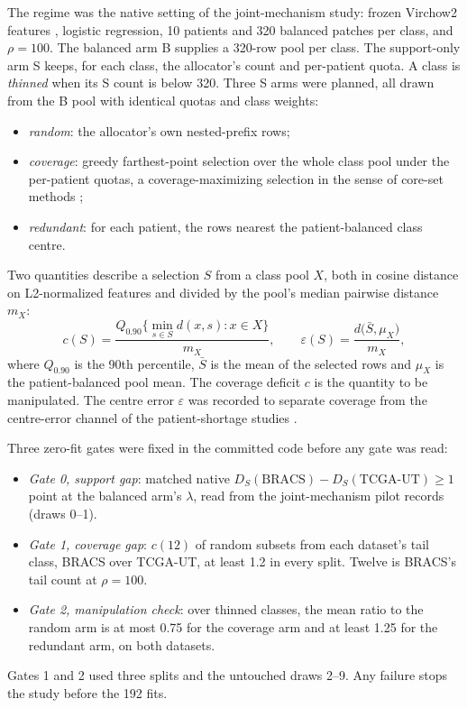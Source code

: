 \documentclass[11pt]{article}
\begin{document}
The regime was the native setting of the joint-mechanism study: frozen Virchow2 features \citep{zimmermann2024virchow2}, logistic regression, 10 patients and 320 balanced patches per class, and $\rho=100$. The balanced arm B supplies a 320-row pool per class. The support-only arm S keeps, for each class, the allocator's count and per-patient quota. A class is \emph{thinned} when its S count is below 320. Three S arms were planned, all drawn from the B pool with identical quotas and class weights:
\begin{itemize}
  \item \emph{random}: the allocator's own nested-prefix rows;
  \item \emph{coverage}: greedy farthest-point selection over the whole class pool under the per-patient quotas, a coverage-maximizing selection in the sense of core-set methods \citep{sener2018coreset};
  \item \emph{redundant}: for each patient, the rows nearest the patient-balanced class centre.
\end{itemize}
Two quantities describe a selection $S$ from a class pool $X$, both in cosine distance on L2-normalized features and divided by the pool's median pairwise distance $m_X$:
\begin{equation}
  c(S) = \frac{Q_{0.90}\bigl\{\min_{s\in S} d(x,s) : x \in X\bigr\}}{m_X},
  \qquad
  \varepsilon(S) = \frac{d\bigl(\bar{S}, \mu_X\bigr)}{m_X},
\end{equation}
\noindent where $Q_{0.90}$ is the 90th percentile, $\bar S$ is the mean of the selected rows and $\mu_X$ is the patient-balanced pool mean. The coverage deficit $c$ is the quantity to be manipulated. The centre error $\varepsilon$ was recorded to separate coverage from the centre-error channel of the patient-shortage studies \citep{queisler2026centreError}.

Three zero-fit gates were fixed in the committed code before any gate was read:
\begin{itemize}
  \item \emph{Gate 0, support gap}: matched native $D_S(\text{BRACS}) - D_S(\text{TCGA-UT}) \ge 1$ point at the balanced arm's $\lambda$, read from the joint-mechanism pilot records (draws 0--1).
  \item \emph{Gate 1, coverage gap}: $c(12)$ of random subsets from each dataset's tail class, BRACS over TCGA-UT, at least 1.2 in every split. Twelve is BRACS's tail count at $\rho=100$.
  \item \emph{Gate 2, manipulation check}: over thinned classes, the mean ratio to the random arm is at most 0.75 for the coverage arm and at least 1.25 for the redundant arm, on both datasets.
\end{itemize}
Gates 1 and 2 used three splits and the untouched draws 2--9. Any failure stops the study before the 192 fits.
\end{document}
